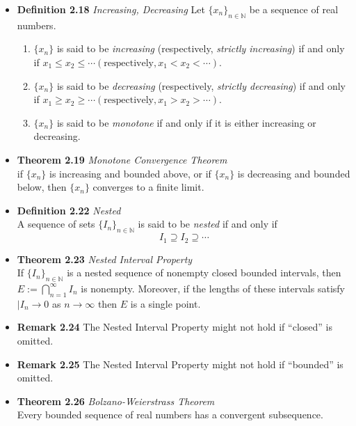 \documentclass[11pt,a4paper]{article}
\begin{document}
\begin{itemize}
    \item \textbf{Definition 2.18} \emph{Increasing, Decreasing}
        Let ${\{x_n\}}_{n \in \mathbb{N}}$ be a sequence of real numbers.
        \begin{enumerate}
            \item $\{x_n\}$ is said to be \emph{increasing}
                (respectively, \emph{strictly increasing}) if and only if
                $x_1 \leq x_2 \leq \cdots (\text{respectively}, x_1 < x_2 < \cdots)$.
            \item $\{x_n\}$ is said to be \emph{decreasing}
                (respectively, \emph{strictly decreasing}) if and only if
                $x_1 \geq x_2 \geq \cdots (\text{respectively}, x_1 > x_2 > \cdots)$.
            \item $\{x_n\}$ is said to be \emph{monotone} if and only if it is either
                increasing or decreasing.
        \end{enumerate}

    \item \textbf{Theorem 2.19} \emph{Monotone Convergence Theorem} \\
        if $\{x_n\}$ is increasing and bounded above, or if $\{x_n\}$ is decreasing and bounded
        below, then $\{x_n\}$ converges to a finite limit.

    \item \textbf{Definition 2.22} \emph{Nested} \\
        A sequence of sets ${\{I_n\}}_{n \in \mathbb{N}}$ is said to be \emph{nested}
        if and only if
        \[
            I_1 \supseteq I_2 \supseteq \cdots
        \]


    \item \textbf{Theorem 2.23} \emph{Nested Interval Property} \\
        If ${\{I_n\}}_{n \in \mathbb{N}}$ is a nested sequence of nonempty closed bounded
        intervals, then $E := \bigcap_{n=1}^\infty I_n$ is nonempty.
        Moreover, if the lengths of these intervals satisfy $|I_n \to 0$ as $n \to \infty$
        then $E$ is a single point.

    \item \textbf{Remark 2.24}
        The Nested Interval Property might not hold if ``closed'' is omitted.

    \item \textbf{Remark 2.25}
        The Nested Interval Property might not hold if ``bounded'' is omitted.

    \item \textbf{Theorem 2.26} \emph{Bolzano-Weierstrass Theorem} \\
        Every bounded sequence of real numbers has a convergent subsequence.

\end{itemize}
\end{document}
